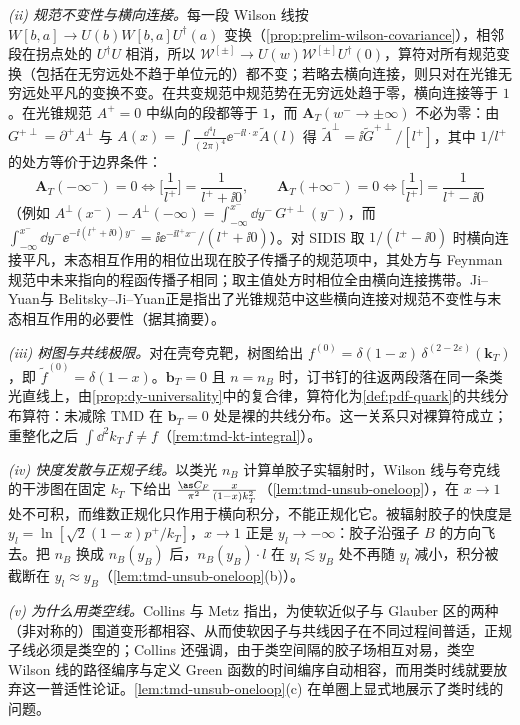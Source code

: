 \emph{(ii) 规范不变性与横向连接。}每一段 Wilson 线按 $W[b,a]\to U(b)W[b,a]U^\dagger(a)$ 变换（\cref{prop:prelim-wilson-covariance}），相邻段在拐点处的 $U^\dagger U$ 相消，所以 $\mathcal W^{[\pm]}\to U(w)\mathcal W^{[\pm]}U^\dagger(0)$，算符对所有规范变换（包括在无穷远处不趋于单位元的）都不变；若略去横向连接，则只对在光锥无穷远处平凡的变换不变。在共变规范中规范势在无穷远处趋于零，横向连接等于 $1$\cite[第~13.7.2~节]{Collins2011}。在光锥规范 $A^+=0$ 中纵向的段都等于 $1$，而 $\mathbf A_T(w^-\to\pm\infty)$ 不必为零：由 $G^{+\perp}=\partial^+A^\perp$ 与 $A(x)=\int\frac{\dd^4l}{(2\pi)^4}\ee^{-\ii l\cdot x}\tilde A(l)$ 得 $\tilde A^\perp=\ii\tilde G^{+\perp}/[l^+]$，其中 $1/l^+$ 的处方等价于边界条件：
\begin{equation}\label{eq:tmd-lc-prescription}
\mathbf A_T(-\infty^-)=0\iff\Big[\frac1{l^+}\Big]=\frac1{l^++\ii0},\qquad \mathbf A_T(+\infty^-)=0\iff\Big[\frac1{l^+}\Big]=\frac1{l^+-\ii0}
\end{equation}
（例如 $A^\perp(x^-)-A^\perp(-\infty)=\int_{-\infty}^{x^-}\dd y^-\,G^{+\perp}(y^-)$，而 $\int_{-\infty}^{x^-}\dd y^-\ee^{-\ii(l^++\ii0)y^-}=\ii\ee^{-\ii l^+x^-}/(l^++\ii0)$）。对 SIDIS 取 $1/(l^+-\ii0)$ 时横向连接平凡，末态相互作用的相位出现在胶子传播子的规范项中，其处方与 Feynman 规范中未来指向的程函传播子相同；取主值处方时相位全由横向连接携带。Ji--Yuan\cite{JiYuan2002}与 Belitsky--Ji--Yuan\cite{BelitskyJiYuan2003}正是指出了光锥规范中这些横向连接对规范不变性与末态相互作用的必要性（据其摘要）。

\emph{(iii) 树图与共线极限。}对在壳夸克靶，树图给出 $f^{(0)}=\delta(1-x)\,\delta^{(2-2\varepsilon)}(\mathbf k_T)$，即 $\tilde f^{(0)}=\delta(1-x)$。$\mathbf b_T=0$ 且 $n=n_B$ 时，订书钉的往返两段落在同一条类光直线上，由\cref{prop:dy-universality}中的复合律，算符化为\cref{def:pdf-quark}的共线分布算符：未减除 TMD 在 $\mathbf b_T=0$ 处是裸的共线分布。这一关系只对裸算符成立；重整化之后 $\int\dd^2k_T\,f\neq f$（\cref{rem:tmd-kt-integral}）。

\emph{(iv) 快度发散与正规子线。}以类光 $n_B$ 计算单胶子实辐射时，Wilson 线与夸克线的干涉图在固定 $k_T$ 下给出 $\frac{\as C_F}{\pi^2}\frac{x}{(1-x)k_T^2}$（\cref{lem:tmd-unsub-oneloop}），在 $x\to1$ 处不可积，而维数正规化只作用于横向积分，不能正规化它。被辐射胶子的快度是 $y_l=\ln[\sqrt2(1-x)p^+/k_T]$，$x\to1$ 正是 $y_l\to-\infty$：胶子沿强子 $B$ 的方向飞去。把 $n_B$ 换成 $n_B(y_B)$ 后，$n_B(y_B)\cdot l$ 在 $y_l\lesssim y_B$ 处不再随 $y_l$ 减小，积分被截断在 $y_l\approx y_B$（\cref{lem:tmd-unsub-oneloop}(b)）。

\emph{(v) 为什么用类空线。}Collins 与 Metz 指出，为使软近似子与 Glauber 区的两种（非对称的）围道变形都相容、从而使软因子与共线因子在不同过程间普适，正规子线必须是类空的\cite{CollinsMetz2004}；Collins 还强调，由于类空间隔的胶子场相互对易，类空 Wilson 线的路径编序与定义 Green 函数的时间编序自动相容，而用类时线就要放弃这一普适性论证\cite[第~10.6.4~节，第~349--350~页]{Collins2011}。\cref{lem:tmd-unsub-oneloop}(c) 在单圈上显式地展示了类时线的问题。


